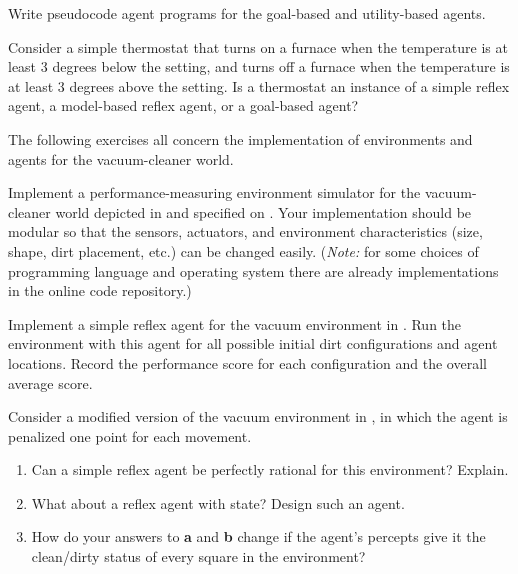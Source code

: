 \begin{exercise}
Write pseudocode agent programs for the goal-based and utility-based agents.
\end{exercise} 

\begin{iexercise}
Consider a simple thermostat that turns on a furnace when the temperature
is at least 3 degrees below the setting, and turns off a furnace when
the temperature is at least 3 degrees above the setting.
Is a thermostat an instance of a simple reflex agent, a model-based reflex 
agent, or a goal-based agent?
\end{iexercise} 


\medskip

\noindent 
\prgex The following exercises all concern the implementation of environments and agents for the vacuum-cleaner world.


\begin{exercise}%
Implement a performance-measuring environment simulator for the
vacuum-cleaner world depicted in  and
specified on .  Your implementation
should be modular so that the sensors, actuators, and environment
characteristics (size, shape, dirt placement, etc.) can be changed
easily. ({\em Note:} for some choices of programming language and operating
system there are already implementations in the online code
repository.)
\end{exercise} 


\begin{uexercise}
Implement a simple reflex agent for the vacuum environment in
.  Run the environment with this
agent for all possible initial dirt configurations and agent locations.
Record the performance score for each configuration and the overall average
score.
\end{uexercise} 

\begin{exercise}%
Consider a modified version of the vacuum environment in
, in which the agent is penalized
one point for each movement.
\begin{enumerate}
\item Can a simple reflex agent be perfectly rational
for this environment? Explain.
\item What about a reflex agent with state? Design such an agent.
\item How do your answers to {\bf a} and {\bf b} change if the agent's
percepts give it the clean/dirty status of every square in the environment?
\end{enumerate}
\end{exercise} 

